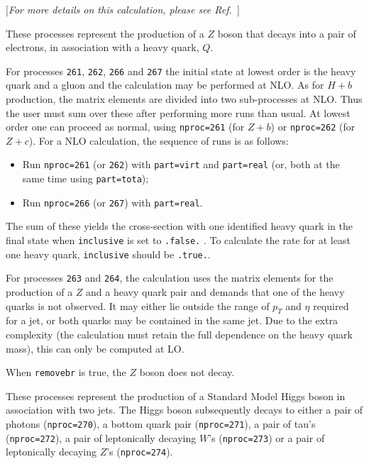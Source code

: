 \label{subsec:ZQ}

\begin{center}
[{\it For more details on this calculation, please see Ref.~\cite{Campbell:2003dd}}]
\end{center}

These processes represent the production of a $Z$
boson that decays into a pair of electrons,
in association with a heavy quark, $Q$.

For processes {\tt 261}, {\tt 262}, {\tt 266} and {\tt 267} the initial
state at lowest order is the heavy quark and a gluon and 
the calculation may be performed at NLO.
As for $H+b$ production, the matrix elements are divided into two
sub-processes at NLO. Thus the user must sum over these after performing
more runs than usual. At lowest order one can proceed as normal, using
{\tt nproc=261} (for $Z+b$) or {\tt nproc=262} (for $Z+c$).
For a NLO calculation, the sequence of runs is as follows:
\begin{itemize}
\item Run {\tt nproc=261} (or {\tt 262}) with {\tt part=virt} and
{\tt part=real} (or, both at the same time using {\tt part=tota});
\item Run {\tt nproc=266} (or {\tt 267}) with {\tt part=real}.
\end{itemize}
The sum of these yields the cross-section with one identified heavy quark in
the final state when {\tt inclusive} is set to {\tt .false.} . To calculate the
rate for at least one heavy quark, {\tt inclusive} should be {\tt .true.}.

For processes {\tt 263} and
{\tt 264}, the calculation uses the matrix elements for the production
of a $Z$ and a heavy quark pair and demands that one of the heavy quarks
is not observed. It may either lie outside the range of $p_T$ and $\eta$
required for a jet, or both quarks may be contained in the same jet.
Due to the extra complexity (the calculation must retain the full
dependence on the heavy quark mass), this can only be computed at LO.

When {\tt removebr} is true, the $Z$ boson does not decay.


These processes represent the production of a Standard Model Higgs boson
in association with two jets. The Higgs boson
subsequently decays to either a pair of photons ({\tt nproc=270}), a bottom quark pair ({\tt nproc=271}), 
a pair of tau's ({\tt nproc=272}), a pair of leptonically decaying $W$'s ({\tt nproc=273}) 
or a pair of leptonically decaying $Z$'s ({\tt nproc=274}).

